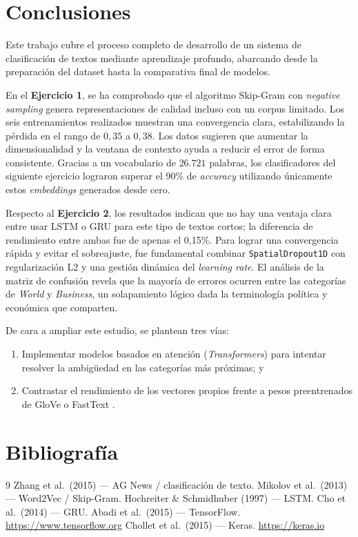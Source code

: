 \documentclass{article}
\begin{document}
\section{Conclusiones}

Este trabajo cubre el proceso completo de desarrollo de un sistema de clasificación de textos mediante aprendizaje profundo, abarcando desde la preparación del dataset hasta la comparativa final de modelos.

En el \textbf{Ejercicio 1}, se ha comprobado que el algoritmo Skip-Gram \cite{mikolov2013} con \textit{negative sampling} genera representaciones de calidad incluso con un corpus limitado. Los seis entrenamientos realizados muestran una convergencia clara, estabilizando la pérdida en el rango de $0,35$ a $0,38$. Los datos sugieren que aumentar la dimensionalidad y la ventana de contexto ayuda a reducir el error de forma consistente. Gracias a un vocabulario de $26.721$ palabras, los clasificadores del siguiente ejercicio lograron superar el 90\% de \textit{accuracy} utilizando únicamente estos \textit{embeddings} generados desde cero.

Respecto al \textbf{Ejercicio 2}, los resultados indican que no hay una ventaja clara entre usar LSTM o GRU para este tipo de textos cortos; la diferencia de rendimiento entre ambas fue de apenas el 0,15\%. Para lograr una convergencia rápida y evitar el sobreajuste, fue fundamental combinar \texttt{SpatialDropout1D} con regularización L2 y una gestión dinámica del \textit{learning rate}. El análisis de la matriz de confusión revela que la mayoría de errores ocurren entre las categorías de \textit{World} y \textit{Business}, un solapamiento lógico dada la terminología política y económica que comparten.

De cara a ampliar este estudio, se plantean tres vías:
\begin{enumerate}
\item Implementar modelos basados en atención (\textit{Transformers}) para intentar resolver la ambigüedad en las categorías más próximas; y 
\item Contrastar el rendimiento de los vectores propios frente a pesos preentrenados de GloVe o FastText \cite{mikolov2013}.
\end{enumerate}

\newpage
\section*{Bibliografía}

\begin{thebibliography}{9}
 Zhang et al.\ (2015) --- AG News / clasificación de texto.
 Mikolov et al.\ (2013) --- Word2Vec / Skip-Gram.
 Hochreiter \& Schmidhuber (1997) --- LSTM.
 Cho et al.\ (2014) --- GRU.
 Abadi et al.\ (2015) --- TensorFlow. \url{https://www.tensorflow.org}
 Chollet et al.\ (2015) --- Keras. \url{https://keras.io}
\end{thebibliography}
\end{document}
